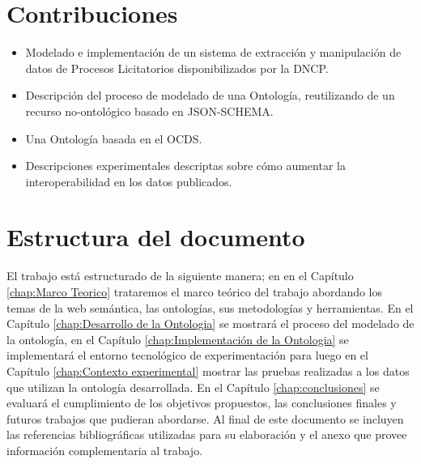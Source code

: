 \section{Contribuciones}
\label{Contribuciones}
\begin{itemize}
\item Modelado e implementación de un sistema de extracción y manipulación de datos de Procesos Licitatorios disponibilizados por la DNCP.
\item Descripción del proceso de modelado de una Ontología, reutilizando de un recurso no-ontológico basado en JSON-SCHEMA.
\item Una Ontología basada en el OCDS.
\item Descripciones experimentales descriptas sobre cómo aumentar la interoperabilidad en los datos publicados.
\end{itemize}
 

\section{Estructura del documento}
El trabajo está estructurado de la siguiente manera; en  en el  Capítulo \ref{chap:Marco Teorico}  trataremos el marco teórico del trabajo abordando los temas de la web semántica, las ontologías, sus metodologías y herramientas. En el Capítulo \ref{chap:Desarrollo de la Ontologia} se mostrará el proceso del modelado de la ontología, en el Capítulo \ref{chap:Implementación de la Ontologia} se implementará el entorno tecnológico de experimentación para luego en el Capítulo  \ref{chap:Contexto experimental} mostrar las pruebas realizadas a los datos que utilizan la ontología desarrollada. En el Capítulo \ref{chap:conclusiones} se evaluará el cumplimiento de los objetivos propuestos, las conclusiones finales y futuros trabajos que pudieran abordarse. Al final de este documento  se  incluyen las referencias bibliográficas utilizadas para su elaboración y el anexo que provee información complementaria al trabajo.


